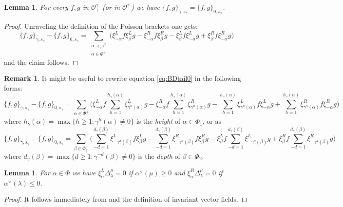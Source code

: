 \documentclass[a4paper]{amsart}
\newtheorem{lemma}[theorem]{Lemma}
\theoremstyle{definition}
\newtheorem{remark}[theorem]{Remark}
\newcommand{\mcO}{\mathcal{O}}
\begin{document}
\begin{lemma}
  For every $f,g$ in $\mcO^\gamma_+$ (or in $\mcO^\gamma_-$) we have $\{f,g\}_{\gamma,s_\gamma} =\{f,g\}_{0,s_\gamma}$.
\end{lemma}

\begin{proof}
  Unraveling the definition of the Poisson brackets one gets:
  \begin{equation}
    \label{eq:BDtail0}
    \{f,g\}_{\gamma,s_\gamma} - \{f,g\}_{0,s_\gamma}
    = 
    \sum_{\substack{\alpha\prec_\gamma\beta\\ \alpha\in\Phi^+}} \Big(\xi_{-\alpha}^L f \xi_\beta^L g - \xi_{-\alpha}^R f \xi_\beta^R g - \xi_\beta^L f \xi_{-\alpha}^L g + \xi_\beta^R f \xi_{-\alpha}^R g\Big)
  \end{equation}
  and the claim follows.
\end{proof}

\begin{remark}
  It might be useful to rewrite equation \eqref{eq:BDtail0} in the following forms:
  \begin{equation}
    \label{eq:BDtail1}
    \{f,g\}_{\gamma,s_\gamma} - \{f,g\}_{0,s_\gamma}
    = 
    \sum_{\alpha\in\Phi_1^+} 
    \Big(
      \xi_{-\alpha}^L f \sum_{h=1}^{h_\gamma(\alpha)} \xi_{\gamma^h(\alpha)}^L g 
      -\xi_{-\alpha}^R f \sum_{h=1}^{h_\gamma(\alpha)} \xi_{\gamma^h(\alpha)}^R g
      - \sum_{h=1}^{h_\gamma(\alpha)} \xi_{\gamma^h(\alpha)}^L f \xi_{-\alpha}^L g
      + \sum_{h=1}^{h_\gamma(\alpha)} \xi_{\gamma^h(\alpha)}^R f \xi_{-\alpha}^R g
    \Big)
  \end{equation}
  where $h_\gamma(\alpha)=\max\{h\ge1:\gamma^h(\alpha)\ne0\}$ is the \emph{height} of $\alpha\in\Phi_1$, or as
  \begin{equation}
    \label{eq:BDtail2}
    \{f,g\}_{\gamma,s_\gamma} - \{f,g\}_{0,s_\gamma}
    = 
    \sum_{\beta\in\Phi_2^+} 
    \Big(
      \sum_{-d=1}^{d_\gamma(\beta)}\xi_{-\gamma^d(\beta)}^L f \xi_\beta^L g 
      -\sum_{-d=1}^{d_\gamma(\beta)}\xi_{-\gamma^d(\beta)}^R f \xi_\beta^R g
      - \xi_\beta^L f \sum_{-d=1}^{d_\gamma(\beta)}\xi_{-\gamma^d(\beta)}^L g
      + \xi_\beta^R f \sum_{-d=1}^{d_\gamma(\beta)}\xi_{-\gamma^d(\beta)}^R g
    \Big)
  \end{equation}
  where $d_\gamma(\beta)=\max\{d\ge1:\gamma^{-d}(\beta)\ne0\}$ is the \emph{depth} of $\beta\in\Phi_2$.
\end{remark}

\begin{lemma} For $\alpha\in\Phi$ we have $\xi_\alpha^L \Delta_\lambda^\mu = 0$ if $\alpha^\vee(\mu)\geq0$ and $\xi_\alpha^R \Delta_\lambda^\mu = 0$ if $\alpha^\vee(\lambda)\leq0$.
\end{lemma}
\begin{proof}
  It follows immediately from \cite[Lemma 2.6]{RSW17} and the definition of invariant vector fields.
\end{proof}
\end{document}
